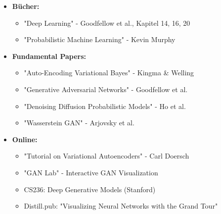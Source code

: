 \documentclass[12pt,a4paper]{article}
\begin{document}
\begin{itemize}
    \item \textbf{Bücher:}
    \begin{itemize}
        \item "Deep Learning" - Goodfellow et al., Kapitel 14, 16, 20
        \item "Probabilistic Machine Learning" - Kevin Murphy
    \end{itemize}
    \item \textbf{Fundamental Papers:}
    \begin{itemize}
        \item "Auto-Encoding Variational Bayes" - Kingma \& Welling
        \item "Generative Adversarial Networks" - Goodfellow et al.
        \item "Denoising Diffusion Probabilistic Models" - Ho et al.
        \item "Wasserstein GAN" - Arjovsky et al.
    \end{itemize}
    \item \textbf{Online:}
    \begin{itemize}
        \item "Tutorial on Variational Autoencoders" - Carl Doersch
        \item "GAN Lab" - Interactive GAN Visualization
        \item CS236: Deep Generative Models (Stanford)
        \item Distill.pub: "Visualizing Neural Networks with the Grand Tour"
    \end{itemize}
\end{itemize}
\end{document}
